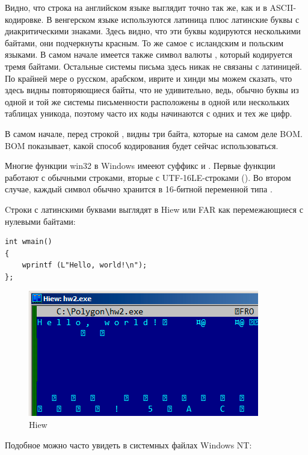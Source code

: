 Видно, что строка на английском языке выглядит точно так же, как и в ASCII-кодировке.
В венгерском языке используются латиница плюс латинские буквы с диакритическими знаками.
Здесь видно, что эти буквы кодируются несколькими байтами, они подчеркнуты красным.
То же самое с исландским и польским языками.
В самом начале имеется также символ валюты , который кодируется тремя байтами.
Остальные системы письма здесь никак не связаны с латиницей.
По крайней мере о русском, арабском, иврите и хинди мы можем сказать, что здесь видны повторяющиеся
байты, что не удивительно, ведь, обычно буквы из одной и той же системы письменности расположены в одной
или нескольких таблицах уникода, поэтому часто их коды начинаются с одних и тех же цифр.

В самом начале, перед строкой , видны три байта, которые на самом деле \ac{BOM}.
\ac{BOM} показывает, какой способ кодирования будет сейчас использоваться.


Многие функции win32 в Windows имееют суффикс  и .
Первые функции работают с обычными строками, вторые с UTF-16LE-строками ().
Во втором случае, каждый символ обычно хранится в 16-битной переменной типа .

Cтроки с латинскими буквами выглядят в Hiew или FAR как перемежающиеся с нулевыми байтами:

\begin{lstlisting}
int wmain()
{
	wprintf (L"Hello, world!\n");
};
\end{lstlisting}

\begin{figure}[H]
\centering
\includegraphics[scale=\NormalScale]{digging_into_code/strings/UTF16-string.png}
\caption{Hiew}
\end{figure}

Подобное можно часто увидеть в системных файлах \gls{Windows NT}:


